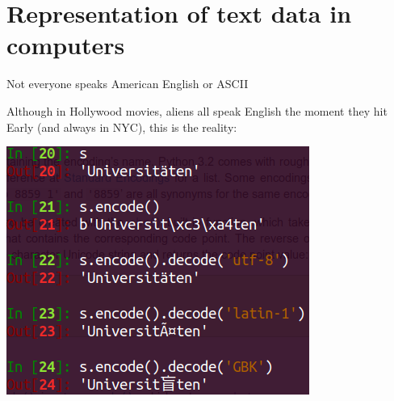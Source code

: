 \documentclass[11pt]{beamer}
\begin{document}
% 
% 
% 
% 
%  
%  

% 




\section{Representation of text data in computers}

\begin{frame}{Not everyone speaks American English or ASCII}

Although in Hollywood movies, aliens all speak English the moment they hit Early (and always in NYC), this is the reality: 

 \includegraphics[width=.6\textwidth]{UTF8_Byte.png}
\end{frame}
\end{document}
